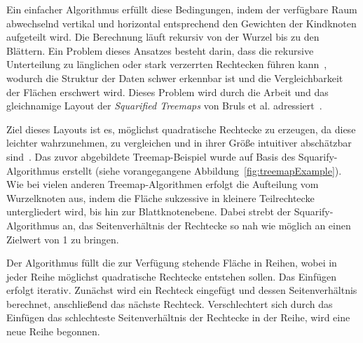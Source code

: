 Ein einfacher Algorithmus erfüllt diese Bedingungen, indem der verfügbare Raum abwechselnd vertikal und horizontal entsprechend den Gewichten der Kindknoten aufgeteilt wird. Die Berechnung läuft rekursiv von der Wurzel bis zu den Blättern. Ein Problem dieses Ansatzes besteht darin, dass die rekursive Unterteilung zu länglichen oder stark verzerrten Rechtecken führen kann~\cite{bruls2000squarified}, wodurch die Struktur der Daten schwer erkennbar ist und die Vergleichbarkeit der Flächen erschwert wird. Dieses Problem wird durch die Arbeit und das gleichnamige Layout der \textit{Squarified Treemaps} von Bruls et al. adressiert~\cite{bruls2000squarified}.

Ziel dieses Layouts ist es, möglichst quadratische Rechtecke zu erzeugen, da diese leichter wahrzunehmen, zu vergleichen und in ihrer Größe intuitiver abschätzbar sind~\cite{bruls2000squarified}. Das zuvor abgebildete Treemap-Beispiel wurde auf Basis des Squarify-Algorithmus erstellt (siehe vorangegangene Abbildung~\ref{fig:treemapExample}). Wie bei vielen anderen Treemap-Algorithmen erfolgt die Aufteilung vom Wurzelknoten aus, indem die Fläche sukzessive in kleinere Teilrechtecke untergliedert wird, bis hin zur Blattknotenebene. Dabei strebt der Squarify-Algorithmus an, das Seitenverhältnis der Rechtecke so nah wie möglich an einen Zielwert von 1 zu bringen.

Der Algorithmus füllt die zur Verfügung stehende Fläche in Reihen, wobei in jeder Reihe möglichst quadratische Rechtecke entstehen sollen. Das Einfügen erfolgt iterativ. Zunächst wird ein Rechteck eingefügt und dessen Seitenverhältnis berechnet, anschließend das nächste Rechteck. Verschlechtert sich durch das Einfügen das schlechteste Seitenverhältnis der Rechtecke in der Reihe, wird eine neue Reihe begonnen.

